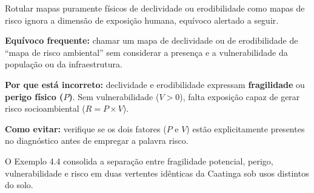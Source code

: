 Rotular mapas puramente físicos de declividade ou erodibilidade como mapas de risco ignora a dimensão de exposição humana, equívoco alertado a seguir.

\begin{boxErro}
\textbf{Equívoco frequente:} chamar um mapa de declividade ou de erodibilidade de ``mapa de risco ambiental'' sem considerar a presença e a vulnerabilidade da população ou da infraestrutura.

\textbf{Por que está incorreto:} declividade e erodibilidade expressam \textbf{fragilidade} ou \textbf{perigo físico ($P$)}. Sem vulnerabilidade ($V > 0$), falta exposição capaz de gerar risco socioambiental ($R = P \times V$).

\textbf{Como evitar:} verifique se os dois fatores ($P$ e $V$) estão explicitamente presentes no diagnóstico antes de empregar a palavra risco.
\end{boxErro}

O Exemplo 4.4 consolida a separação entre fragilidade potencial, perigo, vulnerabilidade e risco em duas vertentes idênticas da Caatinga sob usos distintos do solo.

